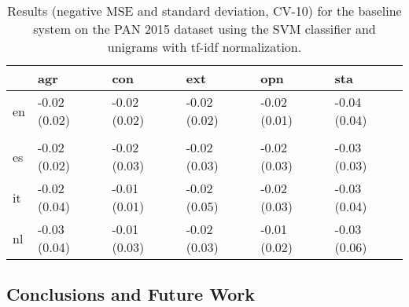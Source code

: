 \documentclass[article,11pt,nofixltx2e]{article}
\begin{document}
\begin{table*}[htb]
\caption{\label{tab:baseline-pan2015}Results (negative MSE and standard deviation, CV-10) for the baseline system on the PAN 2015 dataset using the SVM classifier and unigrams with tf-idf normalization.}
\centering
\begin{tabular}{llllll}
 & agr & con & ext & opn & sta\\
\hline
en & -0.02 (0.02) & -0.02 (0.02) & -0.02 (0.02) & -0.02 (0.01) & -0.04 (0.04)\\
 &  &  &  &  & \\
\hline
es & -0.02 (0.02) & -0.02 (0.03) & -0.02 (0.03) & -0.02 (0.03) & -0.03 (0.03)\\
\hline
it & -0.02 (0.04) & -0.01 (0.01) & -0.02 (0.05) & -0.02 (0.03) & -0.03 (0.04)\\
\hline
nl & -0.03 (0.04) & -0.01 (0.03) & -0.02 (0.03) & -0.01 (0.02) & -0.03 (0.06)\\
\end{tabular}
\end{table*}


\subsection{Conclusions and Future Work}
\label{sec-2-6}
\end{document}
